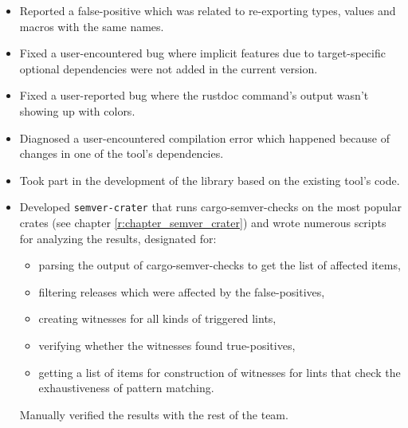 \documentclass[licencjacka,en]{pracamgr}
\begin{document}
\begin{itemize}
\begin{itemize}
			\item Reported a false-positive which was related to re-exporting types, values
				and macros with the same names.
			\item Fixed a user-encountered bug where implicit features due to target-specific
				optional dependencies were not added in the current version.
			\item Fixed a user-reported bug where the rustdoc command's output wasn't showing up
				with colors.
			\item Diagnosed a user-encountered compilation error which happened because of changes
				in one of the tool's dependencies.
			\item Took part in the development of the library based on the existing tool's code.
			\item Developed \texttt{semver-crater} that runs cargo-semver-checks on the most popular crates
				(see chapter \ref{r:chapter_semver_crater})
				and wrote numerous scripts for analyzing the results, designated for:
				\begin{itemize}
					\item parsing the output of cargo-semver-checks to get the list of affected items,
					\item filtering releases which were affected by the  false-positives,
					\item creating witnesses for all kinds of triggered lints,
					\item verifying whether the witnesses found true-positives,
					\item getting a list of items for construction of witnesses
						for lints that check the exhaustiveness of pattern matching.
				\end{itemize}
				Manually verified the results with the rest of the team.
		\end{itemize}


\end{itemize}
\end{document}
